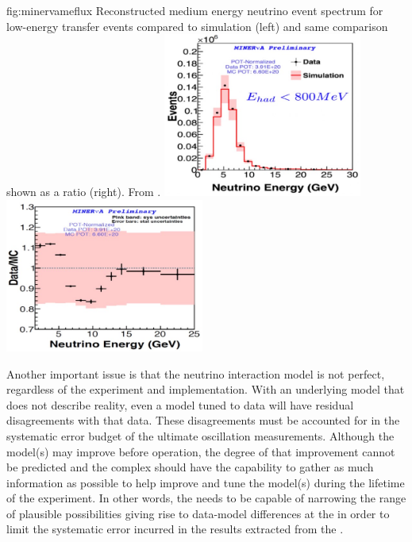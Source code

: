 \begin{dunefigure}{fig:minervameflux}
{Reconstructed  medium energy  neutrino event spectrum for low-energy transfer events compared to simulation (left) and same comparison shown as a ratio (right). From \cite{JenaNUINT2018}.}
\includegraphics[width=0.49\textwidth]{graphics/minerva_enu.jpg}
\includegraphics[width=0.49\textwidth]{graphics/minerva_enuratio.jpg}
\end{dunefigure}

Another important issue is that the neutrino interaction model is not perfect, regardless of the experiment and implementation.  With an underlying model that does not describe reality, even a model tuned to   data will have residual disagreements with that data.  These disagreements must be accounted for in the systematic error budget of the ultimate oscillation measurements.  Although the model(s) may improve before  operation, the degree of that improvement cannot be predicted and the    complex should have the capability to gather as much information as possible to help improve and tune the model(s) during the lifetime of the experiment.  In other words, the   needs to be capable of narrowing the range of plausible possibilities giving rise to data-model differences at the   in order to limit the systematic error incurred in the results extracted from the  .   

